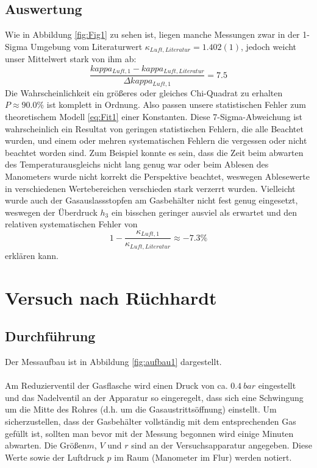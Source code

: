 \documentclass[a4paper,10pt]{article}
\begin{document}
\subsection{Auswertung}
Wie in Abbildung \ref{fig:Fig1} zu sehen ist, liegen manche Messungen zwar in der 1-Sigma Umgebung vom Literaturwert \(\kappa_{Luft,Literatur}=1.402(1)\), jedoch weicht unser Mittelwert stark von ihm ab:
\[\frac{{kappa_{Luft,1}}-{kappa_{Luft,Literatur}}}{\Delta {kappa_{Luft,1}}}=7.5\]
Die Wahrscheinlichkeit ein größeres oder gleiches Chi-Quadrat zu erhalten \(P\approx  90.0 \%\) ist komplett in Ordnung. Also passen unsere statistischen Fehler zum theoretischem Modell \eqref{eq:Fit1} einer Konstanten.
Diese 7-Sigma-Abweichung ist wahrscheinlich ein Resultat von geringen statistischen Fehlern, die alle Beachtet wurden, und einem oder mehren systematischen Fehlern die vergessen oder nicht beachtet worden sind. Zum Beispiel konnte es sein, dass die Zeit beim abwarten des Temperaturausgleichs nicht lang genug war oder beim Ablesen des Manometers wurde nicht korrekt die Perspektive beachtet, weswegen Ablesewerte in verschiedenen Wertebereichen verschieden stark verzerrt wurden. Vielleicht wurde auch der Gasauslassstopfen am Gasbehälter nicht fest genug eingesetzt, weswegen der Überdruck \(h_3\) ein bisschen geringer ausviel als erwartet und den relativen systematischen  Fehler von \[1- \frac{{\kappa_{Luft,1}}}{\kappa_{Luft,Literatur}}\approx -7.3\%\] erklären kann.
\section{ Versuch nach Rüchhardt}
\subsection[Durchführung]{Durchführung\fnrefb}
Der Messaufbau ist in Abbildung \ref{fig:aufbau1} dargestellt.\\\\
Am Reduzierventil der Gasflasche wird einen Druck von ca. \(0.4\:bar\) eingestellt und das Nadelventil an der Apparatur so eingeregelt, dass sich eine Schwingung um die Mitte des Rohres (d.h. um die Gasaustrittsöffnung)
einstellt. Um sicherzustellen, dass der Gasbehälter vollständig mit dem entsprechenden Gas gefüllt ist, sollten man bevor mit der Messung begonnen wird einige Minuten abwarten. Die Größen\(m\), \(V\) und \(r\) sind an der Versuchsapparatur angegeben. Diese Werte sowie der Luftdruck \(p\) im Raum (Manometer im Flur) werden notiert.
\end{document}
